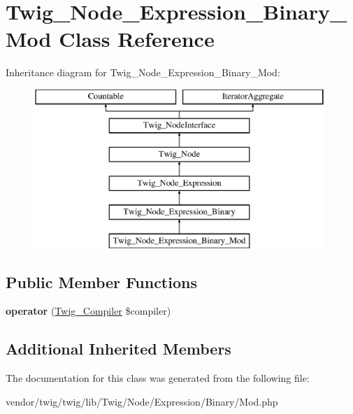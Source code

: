 \hypertarget{classTwig__Node__Expression__Binary__Mod}{}\section{Twig\+\_\+\+Node\+\_\+\+Expression\+\_\+\+Binary\+\_\+\+Mod Class Reference}
\label{classTwig__Node__Expression__Binary__Mod}
Inheritance diagram for Twig\+\_\+\+Node\+\_\+\+Expression\+\_\+\+Binary\+\_\+\+Mod\+:\begin{figure}[H]
\begin{center}
\leavevmode
\includegraphics[height=6.000000cm]{classTwig__Node__Expression__Binary__Mod}
\end{center}
\end{figure}
\subsection*{Public Member Functions}
\begin{DoxyCompactItemize}
\item 
{\bfseries operator} (\hyperlink{classTwig__Compiler}{Twig\+\_\+\+Compiler} \$compiler)\hypertarget{classTwig__Node__Expression__Binary__Mod_a2fb3d74846f18de8dbe1890e2ad98525}{}\label{classTwig__Node__Expression__Binary__Mod_a2fb3d74846f18de8dbe1890e2ad98525}

\end{DoxyCompactItemize}
\subsection*{Additional Inherited Members}


The documentation for this class was generated from the following file\+:\begin{DoxyCompactItemize}
\item 
vendor/twig/twig/lib/\+Twig/\+Node/\+Expression/\+Binary/Mod.\+php\end{DoxyCompactItemize}
